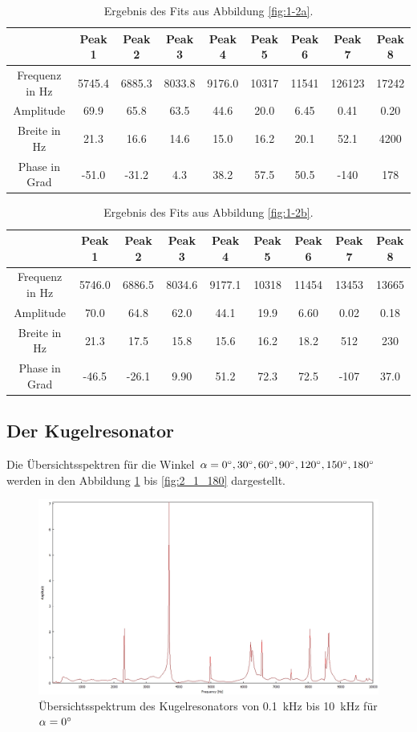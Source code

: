 \begin{table}
\centering
\caption{Ergebnis des Fits aus Abbildung \ref{fig:1-2a}.}
\label{tab:1:1}
\begin{tabular}{c c c c c c c c c}
\hline
 & Peak 1 & Peak 2 & Peak 3 & Peak 4 & Peak 5 & Peak 6&Peak 7&Peak 8 \\ \hline

Frequenz in Hz& 5745.4&6885.3&8033.8&9176.0&10317&11541&126123&17242\\
Amplitude&69.9&65.8&63.5&44.6&20.0&6.45&0.41&0.20\\
Breite in Hz&21.3&16.6&14.6&15.0&16.2&20.1&52.1&4200\\
Phase in Grad&-51.0&-31.2&4.3&38.2&57.5&50.5&-140&178\\
\hline
\end{tabular}
\end{table}

\begin{table}
\centering
\caption{Ergebnis des Fits aus Abbildung \ref{fig:1-2b}.}
\label{tab:1:2}
\begin{tabular}{c c c c c c c c c}
\hline
 & Peak 1 & Peak 2 & Peak 3 & Peak 4 & Peak 5 & Peak 6&Peak 7&Peak 8 \\ \hline

Frequenz in Hz&5746.0&6886.5&8034.6&9177.1&10318&11454&13453&13665\\
Amplitude&70.0&64.8&62.0&44.1&19.9&6.60&0.02&0.18\\
Breite in Hz&21.3&17.5&15.8&15.6&16.2&18.2&512&230\\
Phase in Grad&-46.5&-26.1&9.90&51.2&72.3&72.5&-107&37.0\\
\hline
\end{tabular}
\end{table}
\FloatBarrier
\subsection{Der Kugelresonator}
\label{subsec:Der Kugelresonator}
Die Übersichtsspektren für die Winkel $\alpha=0\degree,30\degree,60\degree,90\degree,120\degree,150\degree,180\degree$ werden in den Abbildung \ref{fig:2_1_0} bis \ref{fig:2_1_180} dargestellt.
\begin{figure}
\centering
\includegraphics[width=\textwidth]{content/messungen/Chapter2new/2_1_0img.jpg}
\caption{Übersichtsspektrum des Kugelresonators von 0.1~kHz bis 10~kHz für $\alpha=0\degree$}
\label{fig:2_1_0}
\end{figure}

